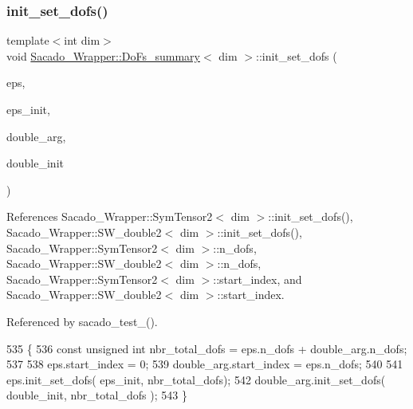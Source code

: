 \subsubsection{\texorpdfstring{init\+\_\+set\+\_\+dofs()}{init\_set\_dofs()}}
{\footnotesize\ttfamily template$<$int dim$>$ \\
void \hyperlink{classSacado__Wrapper_1_1DoFs__summary}{Sacado\+\_\+\+Wrapper\+::\+Do\+Fs\+\_\+summary}$<$ dim $>$\+::init\+\_\+set\+\_\+dofs (\begin{DoxyParamCaption}\item[{\hyperlink{classSacado__Wrapper_1_1SymTensor2}{Sym\+Tensor2}$<$ dim $>$ \&}]{eps,  }\item[{Symmetric\+Tensor$<$ 2, dim $>$ \&}]{eps\+\_\+init,  }\item[{\hyperlink{classSacado__Wrapper_1_1SW__double2}{S\+W\+\_\+double2}$<$ dim $>$ \&}]{double\+\_\+arg,  }\item[{double \&}]{double\+\_\+init }\end{DoxyParamCaption})}



References Sacado\+\_\+\+Wrapper\+::\+Sym\+Tensor2$<$ dim $>$\+::init\+\_\+set\+\_\+dofs(), Sacado\+\_\+\+Wrapper\+::\+S\+W\+\_\+double2$<$ dim $>$\+::init\+\_\+set\+\_\+dofs(), Sacado\+\_\+\+Wrapper\+::\+Sym\+Tensor2$<$ dim $>$\+::n\+\_\+dofs, Sacado\+\_\+\+Wrapper\+::\+S\+W\+\_\+double2$<$ dim $>$\+::n\+\_\+dofs, Sacado\+\_\+\+Wrapper\+::\+Sym\+Tensor2$<$ dim $>$\+::start\+\_\+index, and Sacado\+\_\+\+Wrapper\+::\+S\+W\+\_\+double2$<$ dim $>$\+::start\+\_\+index.



Referenced by sacado\+\_\+test\+\_().


\begin{DoxyCode}
535     \{
536         \textcolor{keyword}{const} \textcolor{keywordtype}{unsigned} \textcolor{keywordtype}{int} nbr\_total\_dofs = eps.n\_dofs + double\_arg.n\_dofs;
537 
538         eps.start\_index = 0;
539         double\_arg.start\_index = eps.n\_dofs;
540         
541         eps.init\_set\_dofs( eps\_init, nbr\_total\_dofs);
542         double\_arg.init\_set\_dofs( double\_init, nbr\_total\_dofs );
543     \}
\end{DoxyCode}
\mbox{\label{classSacado__Wrapper_1_1DoFs__summary_a556293f6e683cb30151d9faadc2cc90d}} 
